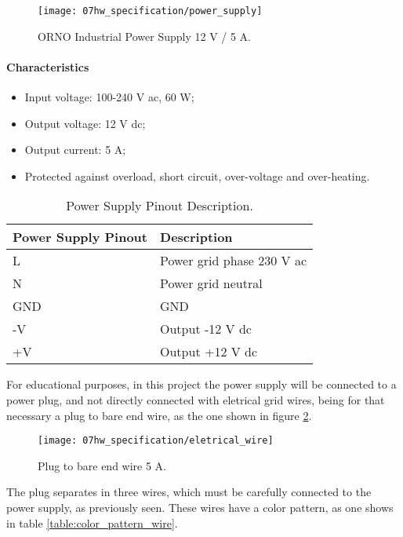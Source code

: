 \begin{figure}[H]
	\centering
	\texttt{[image: 07hw\_specification/power\_supply]}
	\caption{ORNO Industrial Power Supply 12 V / 5 A.}
	\label{fig:power_supply}
\end{figure}

\paragraph*{Characteristics}
\begin{itemize}
	\item Input voltage: 100-240 V \ac{ac}, 60 W;
	\item Output voltage: 12 V \ac{dc};
	\item Output current: 5 A;
	\item Protected against overload, short circuit, over-voltage and over-heating.
\end{itemize}

\begin{table}[H]
	\centering
	\begin{tabular}{|m{5cm}|m{6cm}|}
		\hline
		\textbf{Power Supply Pinout} & \textbf{Description}
		\\\hline\hline
		 
		L & Power grid phase 230 V \ac{ac}
		\\\hline
		N & Power grid neutral
		\\\hline
		GND & GND
		\\\hline
		-V & Output -12 V \ac{dc}
		\\\hline
		+V & Output +12 V \ac{dc}
		\\\hline
	\end{tabular}
	\caption{Power Supply Pinout Description.}
	\label{table:power_supply_pinout}
\end{table}

For educational purposes, in this project the power supply will be connected to a power plug, and not directly connected with eletrical grid wires, being for that necessary a plug to bare end wire, as the one shown in figure \ref{fig:eletrical_wire}.

\begin{figure}[H]
	\centering
	\texttt{[image: 07hw\_specification/eletrical\_wire]}
	\caption{Plug to bare end wire 5 A.}
	\label{fig:eletrical_wire}
\end{figure}

The plug separates in three wires, which must be carefully connected to the power supply, as previously seen. These wires have a color pattern, as one shows in table \ref{table:color_pattern_wire}.

